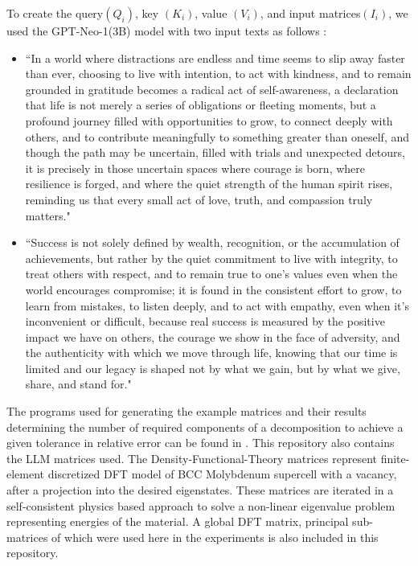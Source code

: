 \documentclass[onefignum,onetabnum]{siamart171218}
\begin{document}
To create the query$(Q_i)$, key $(K_i)$, value $(V_i)$, and input matrices$(I_i)$, we used the GPT-Neo-1(3B) model with two input texts as follows :
\begin{itemize}
    \item ``In a world where distractions are endless and time seems to slip away faster than ever, choosing to live with intention, to act with kindness, and to remain grounded in gratitude becomes a radical act of self-awareness, a declaration that life is not merely a series of obligations or fleeting moments, but a profound journey filled with opportunities to grow, to connect deeply with others, and to contribute meaningfully to something greater than oneself, and though the path may be uncertain, filled with trials and unexpected detours, it is precisely in those uncertain spaces where courage is born, where resilience is forged, and where the quiet strength of the human spirit rises, reminding us that every small act of love, truth, and compassion truly matters."

    \item ``Success is not solely defined by wealth, recognition, or the accumulation of achievements, but rather by the quiet commitment to live with integrity, to treat others with respect, and to remain true to one’s values even when the world encourages compromise; it is found in the consistent effort to grow, to learn from mistakes, to listen deeply, and to act with empathy, even when it’s inconvenient or difficult, because real success is measured by the positive impact we have on others, the courage we show in the face of adversity, and the authenticity with which we move through life, knowing that our time is limited and our legacy is shaped not by what we gain, but by what we give, share, and stand for."
\end{itemize}
The programs used for generating the example matrices and their results determining the number of required components of a decomposition to achieve a given tolerance in relative error can be found in \cite{Codes}. This repository also contains the LLM matrices used. The Density-Functional-Theory matrices represent finite-element discretized DFT model of BCC Molybdenum supercell with a vacancy, after a projection into the desired eigenstates. These matrices are iterated in a self-consistent physics based approach to solve a non-linear eigenvalue problem representing energies of the material. A global DFT matrix, principal sub-matrices of which were used here in the experiments is also included in this repository.\\
\end{document}
